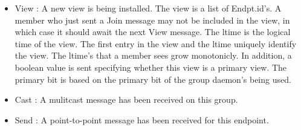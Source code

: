 \begin{itemize}
\item{View} : A new view is being installed. The view is a
list of Endpt.id's.  A member who just sent a Join message may not be
included in the view, in which case it should await the next View
message.  The ltime is the logical time of the view.  The first entry
in the view and the ltime uniquely identify the view.  The ltime's
that a member sees grow monotonicly.  In addition, a boolean value is
sent specifying whether this view is a primary view.  The primary bit
is based on the primary bit of the group daemon's being used.

\begin{FormatTable}
\end{FormatTable}

\item{Cast} : A mulitcast message has been received on this group. 
\begin{FormatTable}
\end{FormatTable}

\item{Send} : A point-to-point message has been received for this
  endpoint. 
\begin{FormatTable}
\end{FormatTable}


\end{itemize}
